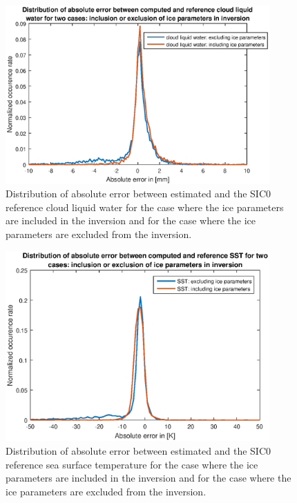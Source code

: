 \documentclass[11pt, a4paper]{article}
\begin{document}
\begin{figure}[h]
	\centering
	\includegraphics[width=0.9\textwidth]{task6_fig_3.eps}
	\caption{Distribution of absolute error between estimated and the SIC0 reference cloud liquid water for the case where the ice parameters are included in the inversion and for the case where the ice parameters are excluded from the inversion.}
	\label{fig:task6_fig_3}
\end{figure}
\begin{figure}[h]
	\centering
	\includegraphics[width=0.9\textwidth]{task6_fig_4.eps}
	\caption{Distribution of absolute error between estimated and the SIC0 reference sea surface temperature for the case where the ice parameters are included in the inversion and for the case where the ice parameters are excluded from the inversion.}
	\label{fig:task6_fig_4}
\end{figure}
\end{document}
